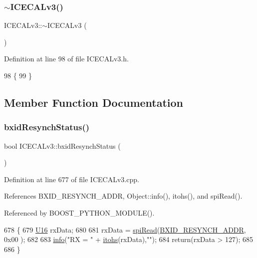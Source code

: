 \subsubsection{\texorpdfstring{$\sim$\+I\+C\+E\+C\+A\+Lv3()}{~ICECALv3()}}
{\footnotesize\ttfamily I\+C\+E\+C\+A\+Lv3\+::$\sim$\+I\+C\+E\+C\+A\+Lv3 (\begin{DoxyParamCaption}{ }\end{DoxyParamCaption})\hspace{0.3cm}{\ttfamily [inline]}}



Definition at line 98 of file I\+C\+E\+C\+A\+Lv3.\+h.


\begin{DoxyCode}
98              \{
99   \}
\end{DoxyCode}


\subsection{Member Function Documentation}
\mbox{\label{classICECALv3_a545f51b915a6de5c5f450622d0651a85}} 
\subsubsection{\texorpdfstring{bxid\+Resynch\+Status()}{bxidResynchStatus()}}
{\footnotesize\ttfamily bool I\+C\+E\+C\+A\+Lv3\+::bxid\+Resynch\+Status (\begin{DoxyParamCaption}{ }\end{DoxyParamCaption})}



Definition at line 677 of file I\+C\+E\+C\+A\+Lv3.\+cpp.



References B\+X\+I\+D\+\_\+\+R\+E\+S\+Y\+N\+C\+H\+\_\+\+A\+D\+DR, Object\+::info(), itohs(), and spi\+Read().



Referenced by B\+O\+O\+S\+T\+\_\+\+P\+Y\+T\+H\+O\+N\+\_\+\+M\+O\+D\+U\+L\+E().


\begin{DoxyCode}
678 \{
679     \hyperlink{ICECALv3_8h_adf928e51a60dba0df29d615401cc55a8}{U16} rxData;
680 
681     rxData = \hyperlink{classICECALv3_aced41ce20a0853d6248b8df88412e57a}{spiRead}(\hyperlink{ICECALv3_8h_a57a201af9e55ffd847b551bff2dc71ce}{BXID\_RESYNCH\_ADDR}, 0x00 );
682 
683     \hyperlink{classObject_a644fd329ea4cb85f54fa6846484b84a8}{info}(\textcolor{stringliteral}{"RX = "} + \hyperlink{classICECALv3_a04b02e583f191bfce34d05132cd23834}{itohs}(rxData),\textcolor{stringliteral}{""});
684     \textcolor{keywordflow}{return}(rxData > 127);
685 
686 \}
\end{DoxyCode}
\mbox{\label{classICECALv3_a5ce36881aa89fedf7c37e03620acca6e}} 
